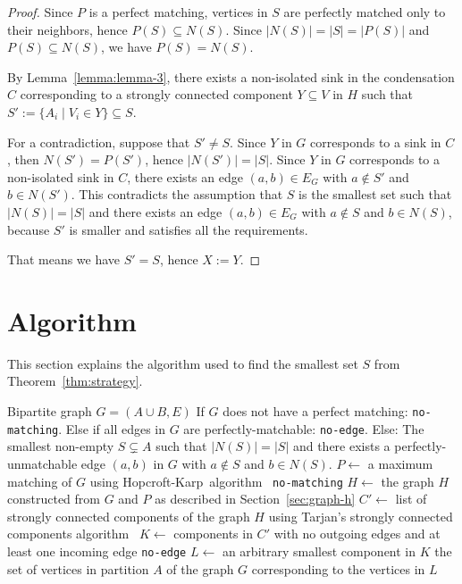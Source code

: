 \begin{proof}
    Since $P$ is a perfect matching, vertices in $S$ are perfectly matched only to their neighbors,
    hence $P(S) \subseteq N(S)$.
    Since $|N(S)| = |S| = |P(S)|$ and $P(S) \subseteq N(S)$, we have $P(S) = N(S)$.

    By Lemma~\ref{lemma:lemma-3}, there exists a non-isolated sink in the condensation $C$
    corresponding to a strongly connected component $Y \subseteq V$ in $H$
    such that $S' := \{A_i \mid V_i \in Y\} \subseteq S$.

    For a contradiction, suppose that $S' \neq S$.
    Since $Y$ in $G$ corresponds to a sink in $C$, then $N(S') = P(S')$, hence $\left|N(S')\right| = \left|S\right|$.
    Since $Y$ in $G$ corresponds to a non-isolated sink in $C$,
    there exists an edge $(a, b) \in E_G$ with $a \notin S'$ and $b \in N(S')$.
    This contradicts the assumption that $S$ is the smallest set such that $\left|N(S)\right| = \left|S\right|$ and
    there exists an edge $(a, b) \in E_G$ with $a \notin S$ and $b \in N(S)$, because
    $S'$ is smaller and satisfies all the requirements.

    That means we have $S' = S$, hence $X := Y$.
\end{proof}

\section{Algorithm}

This section explains the algorithm used to find the smallest set $S$ from Theorem~\ref{thm:strategy}.

\begin{algorithm}
    \caption{Smallest perfect matching strategy}
    \begin{algorithmic}[1]
    \Require Bipartite graph $G = (A \cup B, E)$
    \Ensure If $G$ does not have a perfect matching: \texttt{no-matching}.
    \Ensure Else if all edges in $G$ are perfectly-matchable: \texttt{no-edge}.
    \Ensure Else: The smallest non-empty $S \subsetneq A$ such that $\left|N(S)\right| = \left|S\right|$
    and there exists a perfectly-unmatchable edge $(a, b)$ in $G$ with $a \notin S$ and $b \in N(S)$.
    \State $P \gets$ a maximum matching of $G$ using Hopcroft-Karp~algorithm~\cite{hopcroft1973}
        \Return \texttt{no-matching}
    \EndIf
    \State $H \gets$ the graph $H$ constructed from $G$ and $P$ as described in Section~\ref{sec:graph-h}
    \State $C' \gets$ list of strongly connected components of the graph $H$ using
    Tarjan's strongly connected components algorithm~\cite{tarjan1972}
    \State $K \gets$ components in $C'$ with no outgoing edges and at least one incoming edge
        \Return \texttt{no-edge}
    \EndIf
    \State $L \gets$ an arbitrary smallest component in $K$
    \State \Return the set of vertices in partition $A$ of the graph $G$ corresponding to the vertices in $L$
    \end{algorithmic}\label{alg:algorithm}
\end{algorithm}

